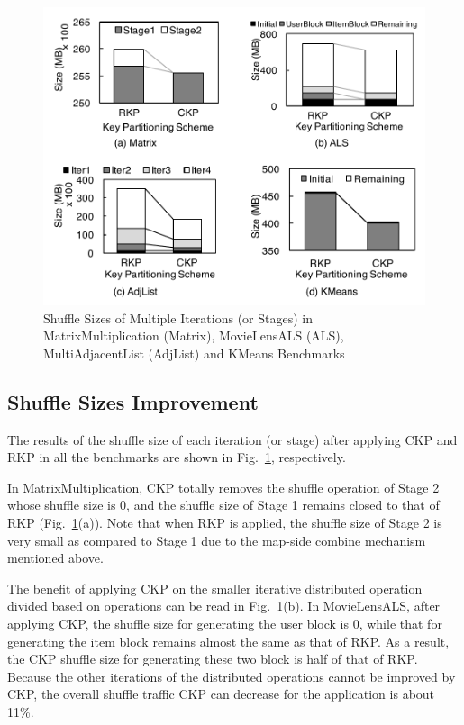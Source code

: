 \documentclass[10pt,journal,compsoc]{IEEEtran}
\begin{document}
\begin{figure}[!t]
\centering
\includegraphics[width=1\columnwidth]{figure5}
\caption{Shuffle Sizes of Multiple Iterations (or Stages) in MatrixMultiplication (Matrix), MovieLensALS (ALS), MultiAdjacentList (AdjList) and KMeans Benchmarks
}
\label{fig:size}
\end{figure}


\subsection{Shuffle Sizes Improvement} 
The results of the shuffle size of each iteration (or stage) after applying CKP and RKP in all the benchmarks are shown in Fig.~\ref{fig:size}, respectively. 

In MatrixMultiplication, CKP totally removes the shuffle operation of Stage 2 whose shuffle size is 0, and the shuffle size of Stage 1 remains closed to that of RKP (Fig.~\ref{fig:size}(a)). 
Note that when RKP is applied, the shuffle size of Stage 2 is very small as compared to Stage 1 due to the map-side combine mechanism mentioned above.


The benefit of applying CKP on the smaller iterative distributed operation divided based on operations can be read in Fig.~\ref{fig:size}(b).
In MovieLensALS, after applying CKP, the shuffle size for generating the user block is 0, while that for generating the item block remains almost the same as that of RKP. 
As a result, the CKP shuffle size for generating these two block is half of that of RKP. 
Because the other iterations of the distributed operations cannot be improved by CKP, 
the overall shuffle traffic CKP can decrease for the application is about 11\%.
\end{document}
